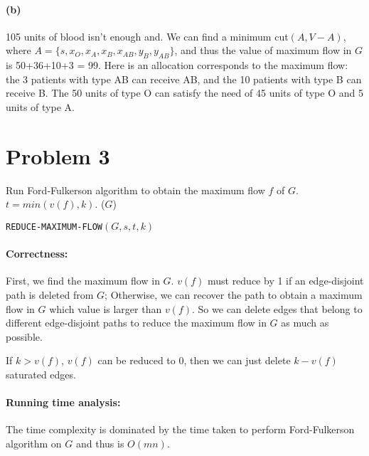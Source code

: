 \documentclass[paper=a4, fontsize=12pt]{scrartcl} %
\numberwithin{equation}{section} %
\numberwithin{figure}{section} %
\numberwithin{table}{section} %
\begin{document}
\paragraph{(b)} 
105 units of blood isn't enough and. We can find a minimum cut$(A,V-A)$, where $A=\{s,x_O,x_A,x_B,x_{AB},y_B,y_{AB}\}$, and thus the value of maximum flow in $G$ is 50+36+10+3 = 99. Here is an allocation corresponds to the maximum flow: the 3 patients with type AB can receive AB, and the 10 patients with type B can receive B. The 50 units of type O can satisfy the need of 45 units of type O and 5 units of type A.

\section*{Problem 3}
\begin{algorithm}[H] 
\SetAlgoLined
\SetNoFillComment
\DontPrintSemicolon
{}
Run Ford-Fulkerson algorithm to obtain the maximum flow $f$ of $G$. \;
$t = min(v(f),k)$. \;
\Return ($G$)
\caption{\texttt{REDUCE-MAXIMUM-FLOW}$(G,s,t,k)$}
\end{algorithm}

\paragraph{Correctness:} First, we find the maximum flow in $G$. $v(f)$ must reduce by 1 if an edge-disjoint path is deleted from $G$; Otherwise, we can recover the path to obtain a maximum flow in $G$ which value is larger than $v(f)$. So we can delete edges that belong to different edge-disjoint paths to reduce the maximum flow in $G$ as much as possible.  \par 
If $k > v(f)$, $v(f)$ can be reduced to 0, then we can just delete $k-v(f)$ saturated edges.\par

\paragraph{Running time analysis:} The time complexity is dominated by the time taken to perform Ford-Fulkerson algorithm on $G$ and thus is $O(mn)$.
\end{document}
